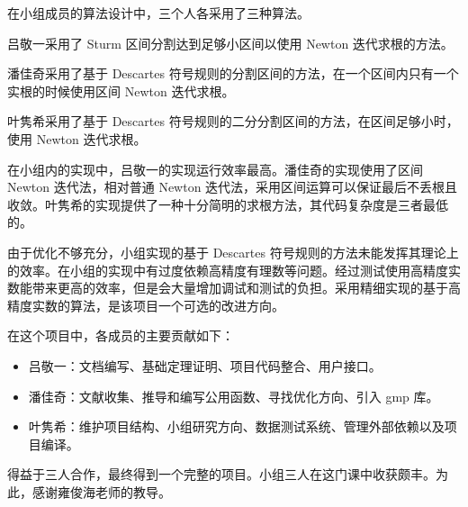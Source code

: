 在小组成员的算法设计中，三个人各采用了三种算法。

吕敬一采用了 Sturm 区间分割达到足够小区间以使用 Newton 迭代求根的方法。

潘佳奇采用了基于 Descartes 符号规则的分割区间的方法，在一个区间内只有一个实根的时候使用区间 Newton 迭代求根。

叶隽希采用了基于 Descartes 符号规则的二分分割区间的方法，在区间足够小时，使用 Newton 迭代求根。

在小组内的实现中，吕敬一的实现运行效率最高。潘佳奇的实现使用了区间 Newton 迭代法，相对普通 Newton 迭代法，采用区间运算可以保证最后不丢根且收敛。叶隽希的实现提供了一种十分简明的求根方法，其代码复杂度是三者最低的。

由于优化不够充分，小组实现的基于 Descartes 符号规则的方法未能发挥其理论上的效率。在小组的实现中有过度依赖高精度有理数等问题。经过测试使用高精度实数能带来更高的效率，但是会大量增加调试和测试的负担。采用精细实现的基于高精度实数的算法，是该项目一个可选的改进方向。

在这个项目中，各成员的主要贡献如下：
\begin{itemize}
	\item 吕敬一：文档编写、基础定理证明、项目代码整合、用户接口。
	\item 潘佳奇：文献收集、推导和编写公用函数、寻找优化方向、引入 gmp 库。
	\item 叶隽希：维护项目结构、小组研究方向、数据测试系统、管理外部依赖以及项目编译。
\end{itemize}

得益于三人合作，最终得到一个完整的项目。小组三人在这门课中收获颇丰。为此，感谢雍俊海老师的教导。

